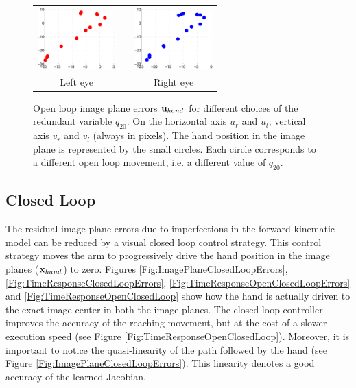 \begin{figure}
  \begin{center}
	\begin{tabular}{ccc}
	  \parbox{30mm}{\includegraphics[width=30mm]{Figure/LeftEyeOpenLoop.eps}}  & \hspace{0.1cm} &
	  \parbox{30mm}{\includegraphics[width=30mm]{Figure/RightEyeOpenLoop.eps}}
	  \\
	  \parbox{30mm}{\centering Left eye } & \hspace{0.1cm} & \parbox{30mm}{\centering Right eye }
  \end{tabular}
\end{center}
\caption{Open loop image plane errors $\mathbf{u}_{hand}$ for different
choices of the redundant variable $q_{20}$. On the horizontal axis 
$u_r$ and $u_l$; vertical axis $v_r$ and $v_l$ (always in pixels).
The hand position in the image plane is represented 
by the small circles.  Each circle corresponds to a different open loop movement, i.e. a different value of $q_{20}$.
}\label{Fig:ImagePlaneOpenLoopErrors}
 \end{figure}

\subsection{Closed Loop}

The residual image plane errors 
due to imperfections in the forward kinematic model can be reduced by a visual closed loop
control strategy. This control strategy moves the arm to progressively 
drive the hand position in the image planes ($\mathbf{x}_{hand}$) to zero. Figures
\ref{Fig:ImagePlaneClosedLoopErrors}, \ref{Fig:TimeResponseClosedLoopErrors}, \ref{Fig:TimeResponseOpenClosedLoopErrors} and \ref{Fig:TimeResponseOpenClosedLoop}  
show how the hand is actually driven to the 
exact image center in both the image planes. The closed loop controller 
improves the accuracy of the reaching movement, but at the cost of a slower 
execution speed (see Figure \ref{Fig:TimeResponseOpenClosedLoop}). 
Moreover, it is important to notice 
the quasi-linearity of the path followed by the hand 
(see Figure \ref{Fig:ImagePlaneClosedLoopErrors}). This linearity denotes 
a good accuracy of the learned Jacobian.

